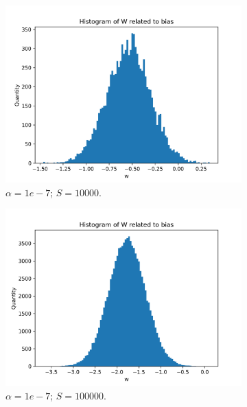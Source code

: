 \documentclass{article}
\begin{document}
\begin{figure}
\begin{subfigure}[t]{0.24\textwidth}
    \includegraphics[width=\linewidth]{hist_featbias_1_sample_10000.png}
    \caption{$\alpha = 1e-7$; $S = 10000$.}
  \end{subfigure}
  \hfill
  \begin{subfigure}[t]{0.24\textwidth}
    \centering
    \includegraphics[width=\linewidth]{hist_featbias_1_sample_100000.png}
    \caption{$\alpha = 1e-7$; $S = 100000$.}
  \end{subfigure}
  \begin{subfigure}[t]{0.24\textwidth}
    \centering

\end{subfigure}
\end{figure}
\end{document}
